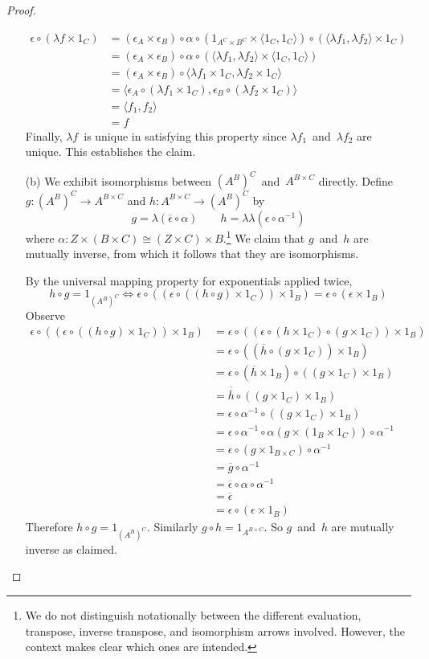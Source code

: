 \documentclass[letterpaper,12pt]{article}
\newcommand{\iso}{\cong}
\newcommand{\after}{\circ}
\newcommand{\eval}{\epsilon}
\newcommand{\pair}[2]{\langle{#1},{#2}\rangle}
\newcommand{\inv}[1]{#1^{-1}}
\newcommand{\curry}[1]{\lambda{#1}}
\newcommand{\uncurry}[1]{\overline{#1}}
\theoremstyle{definition}
\theoremstyle{remark}
\theoremstyle{direction}
\begin{document}
\begin{proof}
\begin{enumerate}[itemsep=0pt]
\begin{align*}
\eval\after(\curry{f}\times1_C)&=(\eval_A\times\eval_B)\after\alpha\after(1_{A^C\times B^C}\times\pair{1_C}{1_C})\after(\pair{\curry{f_1}}{\curry{f_2}}\times1_C)\\
	&=(\eval_A\times\eval_B)\after\alpha\after(\pair{\curry{f_1}}{\curry{f_2}}\times\pair{1_C}{1_C})\\
	&=(\eval_A\times\eval_B)\after\pair{\curry{f_1}\times1_C}{\curry{f_2}\times1_C}\\
	&=\pair{\eval_A\after(\curry{f_1}\times1_C)}{\eval_B\after(\curry{f_2}\times1_C)}\\
	&=\pair{f_1}{f_2}\\
	&=f
\end{align*}
Finally, \(\curry{f}\)~is unique in satisfying this property since \(\curry{f_1}\)~and~\(\curry{f_2}\) are unique. This establishes the claim.
\item[(b)] We exhibit isomorphisms between \((A^B)^C\)~and~\(A^{B\times C}\) directly. Define \(g:(A^B)^C\to A^{B\times C}\) and \(h:A^{B\times C}\to(A^B)^C\) by
\[g=\curry{(\uncurry{\eval}\after\alpha)}\qquad h=\curry{\curry{(\eval\after\inv{\alpha})}}\]
where \(\alpha:Z\times(B\times C)\iso(Z\times C)\times B\).\footnote{We do not distinguish notationally between the different evaluation, transpose, inverse transpose, and isomorphism arrows involved. However, the context makes clear which ones are intended.} We claim that \(g\)~and~\(h\) are mutually inverse, from which it follows that they are isomorphisms.

By the universal mapping property for exponentials applied twice,
\[h\after g=1_{(A^B)^C}\iff\eval\after((\eval\after((h\after g)\times 1_C))\times 1_B)=\eval\after(\eval\times 1_B)\]
Observe
\begin{align*}
\eval\after((\eval\after((h\after g)\times 1_C))\times 1_B)&=\eval\after((\eval\after(h\times1_C)\after(g\times1_C))\times 1_B)\\
	&=\eval\after((\uncurry{h}\after(g\times1_C))\times 1_B)\\
	&=\eval\after(\uncurry{h}\times1_B)\after((g\times1_C)\times1_B)\\
	&=\uncurry{\uncurry{h}}\after((g\times1_C)\times1_B)\\
	&=\eval\after\inv{\alpha}\after((g\times1_C)\times1_B)\\
	&=\eval\after\inv{\alpha}\after\alpha(g\times(1_B\times1_C))\after\inv{\alpha}\\
	&=\eval\after(g\times1_{B\times C})\after\inv{\alpha}\\
	&=\uncurry{g}\after\inv{\alpha}\\
	&=\uncurry{\eval}\after\alpha\after\inv{\alpha}\\
	&=\uncurry{\eval}\\
	&=\eval\after(\eval\times1_B)
\end{align*}
Therefore \(h\after g=1_{(A^B)^C}\). Similarly \(g\after h=1_{A^{B\times C}}\). So \(g\)~and~\(h\) are mutually inverse as claimed.\qedhere
\end{enumerate}
\end{proof}
\end{document}
